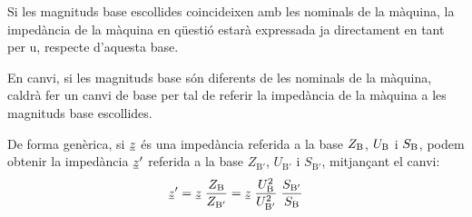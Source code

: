 Si les magnituds base escollides coincideixen amb les nominals de la màquina,
la impedància de la màquina en qüestió estarà expressada ja directament en tant per u, respecte d'aquesta base.

 En canvi, si les magnituds base són diferents de les nominals de la màquina, caldrà fer un canvi de base per tal de referir la impedància de la màquina a les magnituds base escollides.

De forma genèrica, si $\cmplx{z}$ és una impedància referida a la base $Z_\mathrm{B}$, $U_\mathrm{B}$ i $S_\mathrm{B}$, podem obtenir la impedància $\cmplx{z}'$ referida a la base $Z_{\text{B}'}$, $U_{\text{B}'}$ i $S_{\text{B}'}$, mitjançant el canvi:
\begin{equation}
   \cmplx{z}' = \cmplx{z} \; \frac{Z\ped{B}}{Z_{\text{B}'}} = \cmplx{z} \; \frac{U\ped{B}^2}{U_{\text{B}'}^2} \; \frac{S_{\text{B}'}}{S\ped{B}}\label{eq_pu_canvi_base}
\end{equation}


